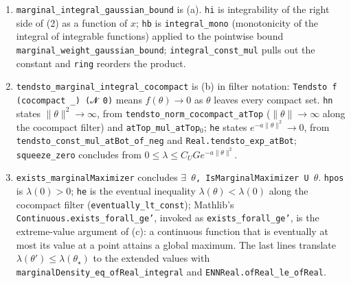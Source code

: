 \documentclass[11pt,a4paper]{report}
\begin{document}
\begin{leanbox}
\begin{enumerate}
\item \texttt{marginal\_\allowbreak{}integral\_\allowbreak{}gaussian\_\allowbreak{}bound} is (a). \texttt{hi} is integrability of the right side of (2) as a function of \(x\); \texttt{hb} is \texttt{integral\_\allowbreak{}mono} (monotonicity of the integral of integrable functions) applied to the pointwise bound \texttt{marginal\_\allowbreak{}weight\_\allowbreak{}gaussian\_\allowbreak{}bound}; \texttt{integral\_\allowbreak{}const\_\allowbreak{}mul} pulls out the constant and \texttt{ring} reorders the product.

\item \texttt{tendsto\_\allowbreak{}marginal\_\allowbreak{}integral\_\allowbreak{}cocompact} is (b) in filter notation: \texttt{Tendsto f (cocompact \_\allowbreak{}) ({\leanfallback 𝓝} 0)} means \(f(\theta)\to0\) as \(\theta\) leaves every compact set. \texttt{hn} states \(\|\theta\|^2\to\infty\), from \texttt{tendsto\_\allowbreak{}norm\_\allowbreak{}cocompact\_\allowbreak{}at\allowbreak{}Top} (\(\|\theta\|\to\infty\) along the cocompact filter) and \texttt{at\allowbreak{}Top\_\allowbreak{}mul\_\allowbreak{}at\allowbreak{}Top\ensuremath{{}_{0}}}; \texttt{he} states \(e^{-a\|\theta\|^2}\to0\), from \texttt{tendsto\_\allowbreak{}const\_\allowbreak{}mul\_\allowbreak{}at\allowbreak{}Bot\_\allowbreak{}of\_\allowbreak{}neg} and \texttt{Real.\allowbreak{}tendsto\_\allowbreak{}exp\_\allowbreak{}at\allowbreak{}Bot}; \texttt{squeeze\_\allowbreak{}zero} concludes from \(0\le\lambda\le C_UGe^{-a\|\theta\|^2}\).

\item \texttt{exists\_\allowbreak{}marginal\allowbreak{}Maximizer} concludes \texttt{\ensuremath{\exists} \ensuremath{\theta}, Is\allowbreak{}Marginal\allowbreak{}Maximizer U \ensuremath{\theta}}. \texttt{hpos} is \(\lambda(0)>0\); \texttt{he} is the eventual inequality \(\lambda(\theta)<\lambda(0)\) along the cocompact filter (\texttt{eventually\_\allowbreak{}lt\_\allowbreak{}const}); Mathlib's \texttt{Continuous.\allowbreak{}exists\_\allowbreak{}forall\_\allowbreak{}ge'}, invoked as \texttt{exists\_\allowbreak{}forall\_\allowbreak{}ge'}, is the extreme-value argument of (c): a continuous function that is eventually at most its value at a point attains a global maximum. The last lines translate \(\lambda(\theta')\le\lambda(\theta_\star)\) to the extended values with \texttt{marginal\allowbreak{}Density\_\allowbreak{}eq\_\allowbreak{}of\allowbreak{}Real\_\allowbreak{}integral} and \texttt{ENNReal.\allowbreak{}of\allowbreak{}Real\_\allowbreak{}le\_\allowbreak{}of\allowbreak{}Real}.

\end{enumerate}
\end{leanbox}
\end{document}
